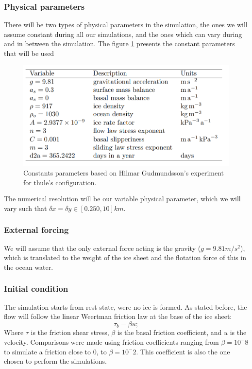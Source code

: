 \documentclass[a4paper,12pt]{article}
\begin{document}
\subsubsection{Physical parameters}
There will be two types of physical parameters in the simulation, the ones we will assume constant during all our simulations, and the ones which can vary during and in between the simulation. The figure \ref{Constants_parameters} presents the constant parameters that will be used
\begin{figure}[!h]
	\centering
	\includegraphics[width=0.7\linewidth]{../fig/Constants_parameters}
	\caption{Constants parameters based on Hilmar Gudmundsson's experiment for thule's configuration.}
	\label{Constants_parameters}
\end{figure}
The numerical resolution will be our variable physical parameter, which we will vary such that $\delta x= \delta y \in [0.250, 10] km$.
\subsubsection{External forcing}
We will assume that the only external force acting is the gravity ($g=9.81 m/s^2$), which is translated to the weight of the ice sheet and the flotation force of this in the ocean water.
\subsubsection{Initial condition}
The simulation starts from rest state, were no ice is formed. 
As stated before, the flow will follow the linear Weertman friction law at the base of the ice sheet:
\begin{equation}
	\tau_b=\beta u;
\end{equation}
Where $\tau$ is the friction shear stress, $\beta$ is the basal friction coefficient, and $u$ is the velocity.
Comparisons were made using friction coefficients ranging from $\beta=10^-8$ to simulate a friction close to 0, to $\beta=10^-2$. This coefficient is also the one chosen to perform the simulations. 
\end{document}

